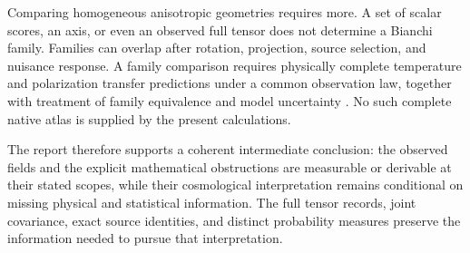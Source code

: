 Comparing homogeneous anisotropic geometries requires more. A set of scalar scores, an axis, or even an observed full tensor does not determine a Bianchi family. Families can overlap after rotation, projection, source selection, and nuisance response. A family comparison requires physically complete temperature and polarization transfer predictions under a common observation law, together with treatment of family equivalence and model uncertainty \cite{Saadeh2016Framework,Saadeh2016PRL}. No such complete native atlas is supplied by the present calculations.

The report therefore supports a coherent intermediate conclusion: the observed fields and the explicit mathematical obstructions are measurable or derivable at their stated scopes, while their cosmological interpretation remains conditional on missing physical and statistical information. The full tensor records, joint covariance, exact source identities, and distinct probability measures preserve the information needed to pursue that interpretation.
